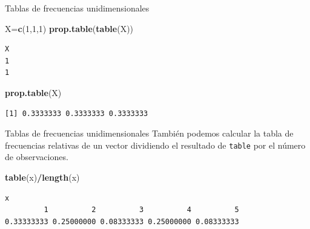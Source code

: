 \documentclass[
  ignorenonframetext,
  aspectratio=169]{beamer}
\newenvironment{Shaded}{\begin{snugshade}}{\end{snugshade}}
\newcommand{\DecValTok}[1]{\textcolor[rgb]{0.00,0.00,0.81}{#1}}
\newcommand{\FunctionTok}[1]{\textcolor[rgb]{0.13,0.29,0.53}{\textbf{#1}}}
\newcommand{\NormalTok}[1]{#1}
\newcommand{\OtherTok}[1]{\textcolor[rgb]{0.56,0.35,0.01}{#1}}
\newcommand{\SpecialCharTok}[1]{\textcolor[rgb]{0.81,0.36,0.00}{\textbf{#1}}}
\begin{document}
\begin{frame}[fragile]{Tablas de frecuencias unidimensionales}
\label{tablas-de-frecuencias-unidimensionales-10}
\begin{Shaded}
\begin{Highlighting}[]
\NormalTok{X}\OtherTok{=}\FunctionTok{c}\NormalTok{(}\DecValTok{1}\NormalTok{,}\DecValTok{1}\NormalTok{,}\DecValTok{1}\NormalTok{)}
\FunctionTok{prop.table}\NormalTok{(}\FunctionTok{table}\NormalTok{(X))}
\end{Highlighting}
\end{Shaded}

\begin{verbatim}
X
1 
1 
\end{verbatim}

\begin{Shaded}
\begin{Highlighting}[]
\FunctionTok{prop.table}\NormalTok{(X)}
\end{Highlighting}
\end{Shaded}

\begin{verbatim}
[1] 0.3333333 0.3333333 0.3333333
\end{verbatim}
\end{frame}

\begin{frame}[fragile]{Tablas de frecuencias unidimensionales}
\label{tablas-de-frecuencias-unidimensionales-11}
También podemos calcular la tabla de frecuencias relativas de un vector
dividiendo el resultado de \texttt{table} por el número de
observaciones.

\begin{Shaded}
\begin{Highlighting}[]
\FunctionTok{table}\NormalTok{(x)}\SpecialCharTok{/}\FunctionTok{length}\NormalTok{(x)}
\end{Highlighting}
\end{Shaded}

\begin{verbatim}
x
         1          2          3          4          5 
0.33333333 0.25000000 0.08333333 0.25000000 0.08333333 
\end{verbatim}
\end{frame}
\end{document}
